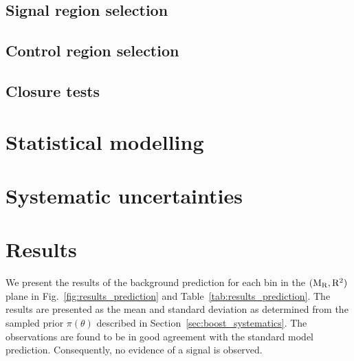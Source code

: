 

\subsection{Signal region selection \label{sec:boost_signal_selection}}



\subsection{Control region selection \label{sec:boost_control_selection}}



\subsection{Closure tests \label{sec:boost_closure_tests}}




\section{Statistical modelling \label{sec:boost_likelihood}}





\section{Systematic uncertainties \label{sec:boost_systematics}}





\section{Results \label{sec:boost_results}}

We present the results of the background prediction for each bin in the $(\mathrm{M_R},\mathrm{R^2})$ plane in
Fig.~\ref{fig:results_prediction} and Table~\ref{tab:results_prediction}. The results are presented
as the mean and standard deviation as determined from the sampled prior $\pi(\theta)$
described in Section~\ref{sec:boost_systematics}.  
The observations are found to be in good agreement with the standard model prediction. Consequently,
no evidence of a signal is observed. 


